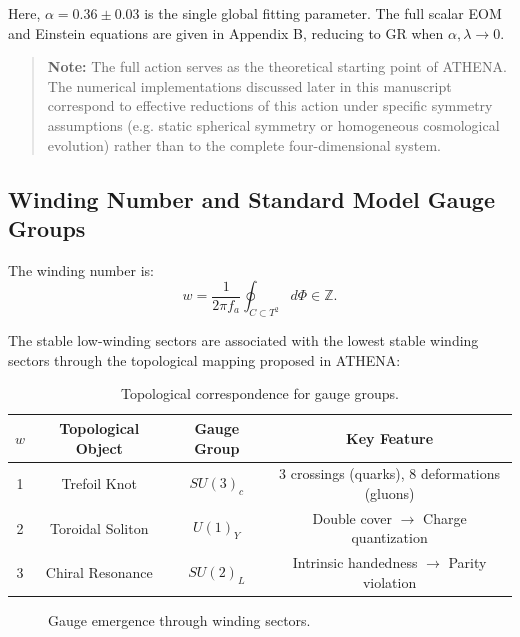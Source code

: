\documentclass[12pt,a4paper]{article}
\numberwithin{equation}{section}
\begin{document}
Here, $\alpha = 0.36 \pm 0.03$ is the single global fitting parameter. The full scalar EOM and Einstein equations are given in Appendix B, reducing to GR when $\alpha, \lambda \to 0$.

\begin{quote}
\textbf{Note:} The full action serves as the theoretical starting point of ATHENA. The numerical implementations discussed later in this manuscript correspond to effective reductions of this action under specific symmetry assumptions (e.g. static spherical symmetry or homogeneous cosmological evolution) rather than to the complete four-dimensional system.
\end{quote}

\subsection{Winding Number and Standard Model Gauge Groups}

The winding number is:
\begin{equation}
w = \frac{1}{2\pi f_a} \oint_{C \subset T^2} d\Phi \in \mathbb{Z}.
\end{equation}

The stable low-winding sectors are associated with the lowest stable winding sectors through the topological mapping proposed in ATHENA:
\begin{table}[h]
\centering
\caption{Topological correspondence for gauge groups.}
\begin{tabular}{c c c c}
\toprule
$w$ & Topological Object & Gauge Group & Key Feature \\
\midrule
1 & Trefoil Knot & $SU(3)_c$ & 3 crossings (quarks), 8 deformations (gluons) \\
2 & Toroidal Soliton & $U(1)_Y$ & Double cover $\rightarrow$ Charge quantization \\
3 & Chiral Resonance & $SU(2)_L$ & Intrinsic handedness $\rightarrow$ Parity violation \\
\bottomrule
\end{tabular}
\label{tab:gauge}
\end{table}

\begin{figure}[h]
\centering
{}
\caption{Gauge emergence through winding sectors.}
\label{fig:gauge}
\end{figure}
\end{document}
